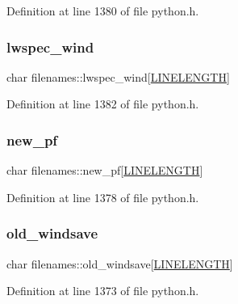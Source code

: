 Definition at line 1380 of file python.\+h.

\mbox{\label{structfilenames_a87e29f1b92b3d9f5be4928380029aaed}} 
\subsubsection{\texorpdfstring{lwspec\+\_\+wind}{lwspec\_wind}}
{\footnotesize\ttfamily char filenames\+::lwspec\+\_\+wind\mbox{[}\hyperlink{xlog_8c_a10e8c7b8458375c3dbfbb4010a2aba8c}{L\+I\+N\+E\+L\+E\+N\+G\+TH}\mbox{]}}



Definition at line 1382 of file python.\+h.

\mbox{\label{structfilenames_a78ff170f6723c4497848c471d5faf579}} 
\subsubsection{\texorpdfstring{new\+\_\+pf}{new\_pf}}
{\footnotesize\ttfamily char filenames\+::new\+\_\+pf\mbox{[}\hyperlink{xlog_8c_a10e8c7b8458375c3dbfbb4010a2aba8c}{L\+I\+N\+E\+L\+E\+N\+G\+TH}\mbox{]}}



Definition at line 1378 of file python.\+h.

\mbox{\label{structfilenames_ad7f42e4035f3ba3be6bbf16d00b7ba35}} 
\subsubsection{\texorpdfstring{old\+\_\+windsave}{old\_windsave}}
{\footnotesize\ttfamily char filenames\+::old\+\_\+windsave\mbox{[}\hyperlink{xlog_8c_a10e8c7b8458375c3dbfbb4010a2aba8c}{L\+I\+N\+E\+L\+E\+N\+G\+TH}\mbox{]}}



Definition at line 1373 of file python.\+h.

\mbox{\label{structfilenames_aebb92f2514d1dbb4fce18c2d30871c67}} 
